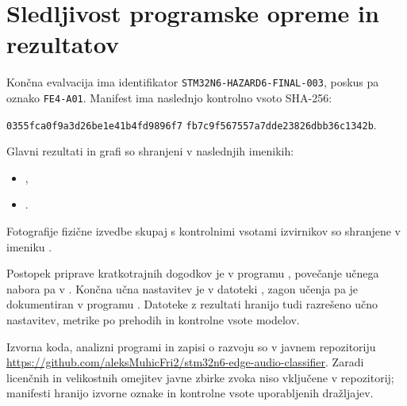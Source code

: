 \chapter{Sledljivost programske opreme in rezultatov}
\label{app:sledljivost}

Končna evalvacija ima identifikator
\texttt{STM32N6-HAZARD6-FINAL-003}, poskus pa oznako \texttt{FE4-A01}.
Manifest ima naslednjo kontrolno vsoto
SHA-256:
\begin{center}
  \small\texttt{0355fca0f9a3d26be1e41b4fd9896f7}\newline
  \texttt{fb7c9f567557a7dde23826dbb36c1342b}.
\end{center}

Glavni rezultati in grafi so shranjeni v naslednjih imenikih:
\begin{itemize}
  \item {},
  \item {}.
\end{itemize}
Fotografije fizične izvedbe skupaj s kontrolnimi vsotami izvirnikov so
shranjene v imeniku .

Postopek priprave kratkotrajnih dogodkov je v programu
, povečanje učnega nabora pa v
. Končna učna nastavitev je v
datoteki , zagon učenja pa
je dokumentiran v programu .
Datoteke z rezultati hranijo tudi razrešeno učno nastavitev, metrike po prehodih
in kontrolne vsote modelov.

Izvorna koda, analizni programi in zapisi o razvoju so v javnem repozitoriju
\url{https://github.com/aleksMuhicFri2/stm32n6-edge-audio-classifier}. Zaradi
licenčnih in velikostnih omejitev javne zbirke zvoka niso vključene v
repozitorij; manifesti hranijo izvorne oznake in kontrolne vsote uporabljenih
dražljajev.
